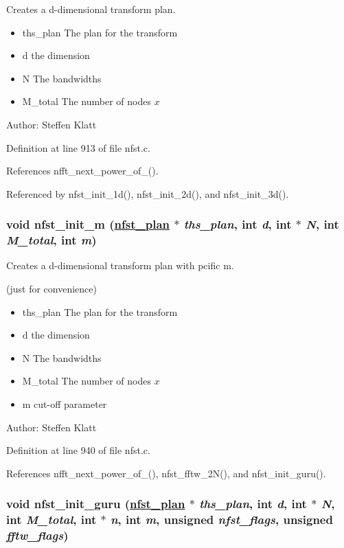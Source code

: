 Creates a d-dimensional transform plan. 

\begin{itemize}
\item ths\_\-plan The plan for the transform \item d the dimension \item N The bandwidths \item M\_\-total The number of nodes $x$\end{itemize}
\begin{Desc}
\item[Author:]Steffen Klatt \end{Desc}


Definition at line 913 of file nfst.c.

References nfft\_\-next\_\-power\_\-of\_().

Referenced by nfst\_\-init\_\-1d(), nfst\_\-init\_\-2d(), and nfst\_\-init\_\-3d().\hypertarget{group__nfsct_ga19}{
\subsubsection[nfst\_\-init\_\-m]{\setlength{\rightskip}{0pt plus 5cm}void nfst\_\-init\_\-m (\hyperlink{structnfst__plan}{nfst\_\-plan} $\ast$ {\em ths\_\-plan}, int {\em d}, int $\ast$ {\em N}, int {\em M\_\-total}, int {\em m})}}
\label{group__nfsct_ga19}


Creates a d-dimensional transform plan with pcific m. 

(just for convenience)

\begin{itemize}
\item ths\_\-plan The plan for the transform \item d the dimension \item N The bandwidths \item M\_\-total The number of nodes $x$ \item m cut-off parameter\end{itemize}
\begin{Desc}
\item[Author:]Steffen Klatt \end{Desc}


Definition at line 940 of file nfst.c.

References nfft\_\-next\_\-power\_\-of\_(), nfst\_\-fftw\_\-2N(), and nfst\_\-init\_\-guru().\hypertarget{group__nfsct_ga20}{
\subsubsection[nfst\_\-init\_\-guru]{\setlength{\rightskip}{0pt plus 5cm}void nfst\_\-init\_\-guru (\hyperlink{structnfst__plan}{nfst\_\-plan} $\ast$ {\em ths\_\-plan}, int {\em d}, int $\ast$ {\em N}, int {\em M\_\-total}, int $\ast$ {\em n}, int {\em m}, unsigned {\em nfst\_\-flags}, unsigned {\em fftw\_\-flags})}}
\label{group__nfsct_ga20}


